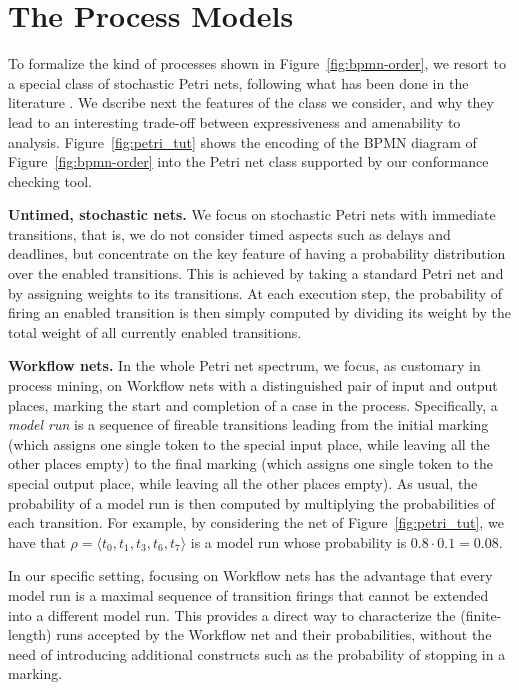 \section{The Process Models}
To formalize the kind of processes shown in Figure~\ref{fig:bpmn-order}, we resort to a special class of stochastic Petri nets, following what has been done in the literature \cite{DBLP:conf/bpm/LeemansSA19,DBLP:journals/tosem/PolyvyanyySWCM20}. We dscribe next the features of the class we consider, and why they lead to an interesting trade-off between expressiveness and amenability to analysis. Figure~\ref{fig:petri_tut} shows the encoding of the BPMN diagram of Figure~\ref{fig:bpmn-order} into the Petri net class supported by our conformance checking tool.

\smallskip
\noindent
\textbf{Untimed, stochastic nets.}
We focus on stochastic Petri nets with immediate transitions, that is, we do not consider timed aspects such as delays and deadlines, but concentrate on the key feature of having a probability distribution over the enabled transitions. This is achieved by taking a standard Petri net and by assigning weights to its transitions. At each execution step, the probability of firing an enabled transition is then simply computed by dividing its weight by the total weight of all currently enabled transitions.

\smallskip
\noindent
\textbf{Workflow nets.} In the whole Petri net spectrum, we focus, as customary in process mining, on Workflow nets with a distinguished pair of input and output places, marking the start and completion of a case in the process. Specifically, a \emph{model run} is a sequence of fireable transitions leading from the initial marking (which assigns one single token to the special input place, while leaving all the other places empty) to the final marking (which assigns one single token to the special output place, while leaving all the other places empty). As usual, the probability of a model run is then computed by multiplying the probabilities of each transition. For example, by considering the net of Figure~\ref{fig:petri_tut}, we have that $\rho = \langle t_0,t_1,t_3,t_6,t_7\rangle$ is a model run whose probability is $0.8 \cdot 0.1 = 0.08$.

In our specific setting, focusing on Workflow nets has the advantage that every model run is a maximal sequence of transition firings that cannot be extended into a different model run. This provides a direct way to characterize the (finite-length) runs accepted by the Workflow net and their probabilities, without the need of introducing additional constructs such as the probability of stopping in a marking.

